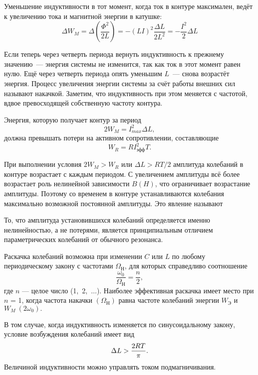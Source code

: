 Уменьшение индуктивности в тот момент, когда ток в контуре максимален, ведёт к увеличению тока и магнитной энергии в катушке:
\begin{equation*}
	\Delta W_M = \Delta \left(\frac{\Phi^2}{2L}\right) = - (LI)^2\frac{\Delta L}{2L^2} = - \frac{I^2}{2}\Delta L
\end{equation*}

Если теперь через четверть периода вернуть индуктивность к прежнему значению~--- энергия системы не изменится, так как ток в этот момент равен нулю. Ещё через четверть периода опять уменьшим $L$~--- снова возрастёт энергия. Процесс увеличения энергии системы за счёт работы внешних сил называют накачкой. Заметим, что индуктивность при этом меняется с частотой, вдвое превосходящей собственную частоту контура.

Энергия, которую получает контур за период
\begin{equation*}
	2W_M = I^2_{max} \Delta L,
\end{equation*}
должна превышать потери на активном сопротивлении, составляющие
\begin{equation*}
	W_R = RI^2_\text{эфф}T.
\end{equation*}

При выполнении условия $2W_M > W_R$ или $\Delta L > RT/2$ амплитуда колебаний в
контуре возрастает с каждым периодом. С увеличением амплитуды всё более
возрастает роль нелинейной зависимости $B(H)$, что ограничивает возрастание
амплитуды. Поэтому со временем в контуре устанавливаются колебания максимально
возможной постоянной амплитуды. Это явление называют 

То, что амплитуда установившихся колебаний определяется именно нелинейностью, а
не потерями, является принципиальным отличием параметрических колебаний от
обычного резонанса.

Раскачка колебаний возможна при изменении $C$ или $L$ по любому периодическому
закону с частотами $\Omega_\text{Н}$, для которых справедливо соотношение
\begin{equation*}
	\frac{\omega_0}{\Omega_\text{Н}} = \frac{n}{2},
\end{equation*}
где $n$ --- целое число (1,~2,~$\dots$). Наиболее эффективная раскачка имеет
место при $n$ = 1, когда частота накачки $(\Omega_\text{Н})$ равна частоте
колебаний энергии $W_\text{Э}$ и $W_M~(2\omega_0).$

 В том случае, когда индуктивность изменяется по синусоидальному закону, условие
возбуждения колебаний имеет вид
\begin{equation}
	\eqmark{4.6.3}
	\Delta L > \frac{2RT}{\pi}.
\end{equation}
Величиной индуктивности можно управлять током подмагничивания.

